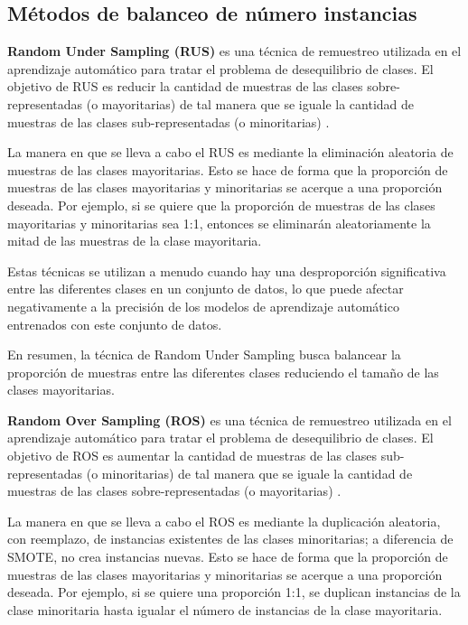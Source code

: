 \subsection{Métodos de balanceo de número instancias}

\textbf{Random Under Sampling (RUS)} es una técnica de remuestreo utilizada en el aprendizaje automático para tratar el problema de desequilibrio de clases. El objetivo de RUS es reducir la cantidad de muestras de las clases sobre-representadas (o mayoritarias) de tal manera que se iguale la cantidad de muestras de las clases sub-representadas (o minoritarias) \cite{junsomboon_combining_2017,hossen_hybrid_2020}.

La manera en que se lleva a cabo el RUS es mediante la eliminación aleatoria de muestras de las clases mayoritarias. Esto se hace de forma que la proporción de muestras de las clases mayoritarias y minoritarias se acerque a una proporción deseada. Por ejemplo, si se quiere que la proporción de muestras de las clases mayoritarias y minoritarias sea 1:1, entonces se eliminarán aleatoriamente la mitad de las muestras de la clase mayoritaria.

Estas técnicas se utilizan a menudo cuando hay una desproporción significativa entre las diferentes clases en un conjunto de datos, lo que puede afectar negativamente a la precisión de los modelos de aprendizaje automático entrenados con este conjunto de datos.

En resumen, la técnica de Random Under Sampling busca balancear la proporción de muestras entre las diferentes clases reduciendo el tamaño de las clases mayoritarias.


\textbf{Random Over Sampling (ROS)} es una técnica de remuestreo utilizada en el aprendizaje automático para tratar el problema de desequilibrio de clases. El objetivo de ROS es aumentar la cantidad de muestras de las clases sub-representadas (o minoritarias) de tal manera que se iguale la cantidad de muestras de las clases sobre-representadas (o mayoritarias)  \cite{junsomboon_combining_2017,hossen_hybrid_2020}.

La manera en que se lleva a cabo el ROS es mediante la duplicación aleatoria, con reemplazo, de instancias existentes de las clases minoritarias; a diferencia de SMOTE, no crea instancias nuevas. Esto se hace de forma que la proporción de muestras de las clases mayoritarias y minoritarias se acerque a una proporción deseada. Por ejemplo, si se quiere una proporción 1:1, se duplican instancias de la clase minoritaria hasta igualar el número de instancias de la clase mayoritaria.

